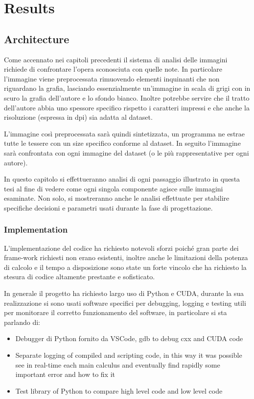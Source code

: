 \chapter{Results}
\begin{toDo}
	\section{Architecture}
	Come accennato nei capitoli precedenti il sistema di analisi delle immagini richiede di confrontare l'opera sconosciuta con quelle note. In particolare l'immagine viene preprocessata rimuovendo elementi inquinanti che non riguardano la grafia, lasciando essenzialmente un'immagine in scala di grigi con in scuro la grafia dell'autore e lo sfondo bianco. Inoltre potrebbe servire che il tratto dell'autore abbia uno spessore specifico rispetto i caratteri impressi e che anche la risoluzione (espressa in \gls{dpi}) sia adatta al dataset.

	\noindent L'immagine così preprocessata sarà quindi sintetizzata, un programma ne estrae tutte le tessere con un size specifico conforme al dataset. In seguito l'immagine sarà confrontata con ogni immagine del dataset (o le più rappresentative per ogni autore).

	\noindent In questo capitolo si effettueranno analisi di ogni passaggio illustrato in questa tesi al fine di vedere come ogni singola componente agisce sulle immagini esaminate. Non solo, si mostreranno anche le analisi effettuate per stabilire specifiche decisioni e parametri usati durante la fase di progettazione.

	\subsection{Implementation}
	L'implementazione del codice ha richiesto notevoli sforzi poiché gran parte dei frame-work richiesti non erano esistenti, inoltre anche le limitazioni della potenza di calcolo e il tempo a disposizione sono state un forte vincolo che ha richiesto la stesura di codice altamente prestante e sofisticato.

	\noindent In generale il progetto ha richiesto largo uso di \gls{Python} e \gls{CUDA}, durante la sua realizzazione si sono usati software specifici per debugging, logging e testing utili per monitorare il corretto funzionamento del software, in particolare si sta parlando di:
	\begin{itemize}
		\item Debugger di \gls{Python} fornito da \gls{VSCode}, \gls{gdb} to debug \gls{cxx} and \gls{CUDA} code
		\item Separate logging of compiled and scripting code, in this way it was possible see in real-time each main calculus and eventually find rapidly some important error and how to fix it
		\item Test library of \gls{Python} to compare high level code and low level code
	\end{itemize}


\end{toDo}
